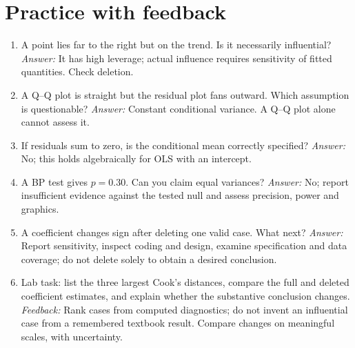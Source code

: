 \documentclass[11pt]{article}
\begin{document}
\section{Practice with feedback}
\begin{enumerate}
\item A point lies far to the right but on the trend. Is it necessarily influential? \textit{Answer:} It has high leverage; actual influence requires sensitivity of fitted quantities. Check deletion.
\item A Q--Q plot is straight but the residual plot fans outward. Which assumption is questionable? \textit{Answer:} Constant conditional variance. A Q--Q plot alone cannot assess it.
\item If residuals sum to zero, is the conditional mean correctly specified? \textit{Answer:} No; this holds algebraically for OLS with an intercept.
\item A BP test gives $p=0.30$. Can you claim equal variances? \textit{Answer:} No; report insufficient evidence against the tested null and assess precision, power and graphics.
\item A coefficient changes sign after deleting one valid case. What next? \textit{Answer:} Report sensitivity, inspect coding and design, examine specification and data coverage; do not delete solely to obtain a desired conclusion.
\item Lab task: list the three largest Cook's distances, compare the full and deleted coefficient estimates, and explain whether the substantive conclusion changes. \textit{Feedback:} Rank cases from computed diagnostics; do not invent an influential case from a remembered textbook result. Compare changes on meaningful scales, with uncertainty.
\end{enumerate}
\end{document}
